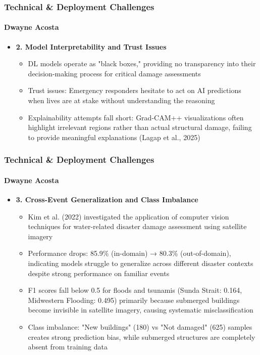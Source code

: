 \documentclass{beamer}
\newcommand{\namedframe}[3]{
  \begin{frame}
    \frametitle{#2}
    \framesubtitle{#1}
    #3
  \end{frame}
}
\begin{document}
\namedframe{Dwayne Acosta}{Technical \& Deployment Challenges}{
\begin{itemize}
    \item \textbf{2. Model Interpretability and Trust Issues}
    \begin{itemize}
        \item DL models operate as "black boxes," providing no transparency into their decision-making process for critical damage assessments
        \item Trust issues: Emergency responders hesitate to act on AI predictions when lives are at stake without understanding the reasoning
        \item Explainability attempts fall short: Grad-CAM++ visualizations often highlight irrelevant regions rather than actual structural damage, failing to provide meaningful explanations (Lagap et al., 2025)
    \end{itemize}
\end{itemize}
}


\namedframe{Dwayne Acosta}{Technical \& Deployment Challenges}{
\begin{itemize}
    \item \textbf{3. Cross-Event Generalization and Class Imbalance}
    \begin{itemize}
      \item Kim et al. (2022) investigated the application of computer vision techniques for water-related disaster damage assessment using satellite imagery
      \item Performance drops: 85.9\% (in-domain) → 80.3\% (out-of-domain), indicating models struggle to generalize across different disaster contexts despite strong performance on familiar events
      \item F1 scores fall below 0.5 for floods and tsunamis (Sunda Strait: 0.164, Midwestern Flooding: 0.495) primarily because submerged buildings become invisible in satellite imagery, causing systematic misclassification
      \item Class imbalance: "New buildings" (180) vs "Not damaged" (625) samples creates strong prediction bias, while submerged structures are completely absent from training data
    \end{itemize}
\end{itemize}
}
\end{document}
